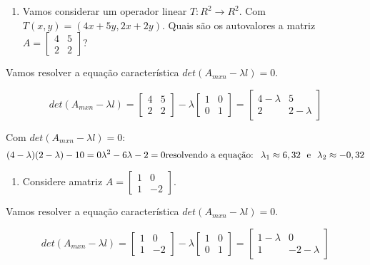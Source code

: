 \documentclass[
]{book}
\providecommand{\tightlist}{%
  \setlength{\itemsep}{0pt}\setlength{\parskip}{0pt}}
\begin{document}
\begin{enumerate}
\def\labelenumi{\arabic{enumi}.}
\tightlist
\item
  Vamos considerar um operador linear \textbf{\(T: R^2 \rightarrow R^2\)}. Com \(T(x,y)=(4x+5y,2x+2y)\). Quais são os autovalores a matriz \(A=\begin{bmatrix} 4 &5 \\ 2 &2 \end{bmatrix}\)?
\end{enumerate}

Vamos resolver a equação característica \(det(A_{mxn}-\lambda l)=0\).

\[det(A_{mxn}-\lambda l)=\begin{bmatrix}
4 &5 \\ 
2 &2 
\end{bmatrix} - \lambda \begin{bmatrix}
1 &0 \\ 
0 &1 
\end{bmatrix} = \begin{bmatrix}
4-\lambda &5 \\ 
2 &2-\lambda 
\end{bmatrix}\]

Com \(det(A_{mxn}-\lambda l)=0:\)
\[(4-\lambda)(2-\lambda)-10=0 \\
\lambda^2-6\lambda-2=0 \\ \mbox{resolvendo a equação: } \ 
\lambda_1 \approx 6,32 \  \ \mbox{e} \ \ \lambda_2 \approx -0,32\]

\begin{enumerate}
\def\labelenumi{\arabic{enumi}.}
\setcounter{enumi}{1}
\tightlist
\item
  Considere amatriz \(A=\begin{bmatrix} 1 &0 \\ 1 &-2 \end{bmatrix}\).
\end{enumerate}

Vamos resolver a equação característica \(det(A_{mxn}-\lambda l)=0\).

\[det(A_{mxn}-\lambda l)=\begin{bmatrix}
1 &0 \\ 
1 &-2 
\end{bmatrix} - \lambda \begin{bmatrix}
1 &0 \\ 
0 &1 
\end{bmatrix} = \begin{bmatrix}
1-\lambda &0 \\ 
1 &-2-\lambda 
\end{bmatrix}\]
\end{document}
